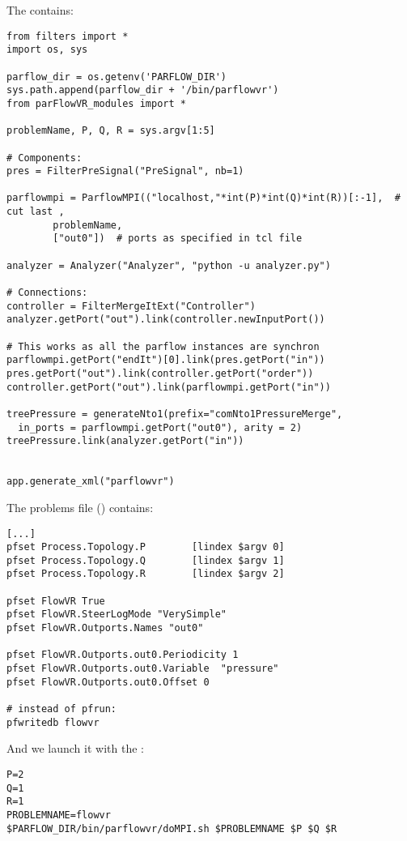 The  contains:
\begin{display}\begin{verbatim}
from filters import *
import os, sys

parflow_dir = os.getenv('PARFLOW_DIR')
sys.path.append(parflow_dir + '/bin/parflowvr')
from parFlowVR_modules import *

problemName, P, Q, R = sys.argv[1:5]

# Components:
pres = FilterPreSignal("PreSignal", nb=1)

parflowmpi = ParflowMPI(("localhost,"*int(P)*int(Q)*int(R))[:-1],  # cut last ,
        problemName,
        ["out0"])  # ports as specified in tcl file

analyzer = Analyzer("Analyzer", "python -u analyzer.py")

# Connections:
controller = FilterMergeItExt("Controller")
analyzer.getPort("out").link(controller.newInputPort())

# This works as all the parflow instances are synchron
parflowmpi.getPort("endIt")[0].link(pres.getPort("in"))
pres.getPort("out").link(controller.getPort("order"))
controller.getPort("out").link(parflowmpi.getPort("in"))

treePressure = generateNto1(prefix="comNto1PressureMerge",
  in_ports = parflowmpi.getPort("out0"), arity = 2)
treePressure.link(analyzer.getPort("in"))


app.generate_xml("parflowvr")
\end{verbatim}\end{display}

The problems  file () contains:
\begin{display}\begin{verbatim}
[...]
pfset Process.Topology.P        [lindex $argv 0]
pfset Process.Topology.Q        [lindex $argv 1]
pfset Process.Topology.R        [lindex $argv 2]

pfset FlowVR True
pfset FlowVR.SteerLogMode "VerySimple"
pfset FlowVR.Outports.Names "out0"

pfset FlowVR.Outports.out0.Periodicity 1
pfset FlowVR.Outports.out0.Variable  "pressure"
pfset FlowVR.Outports.out0.Offset 0

# instead of pfrun:
pfwritedb flowvr
\end{verbatim}\end{display}

And we launch it with the :
\begin{display}\begin{verbatim}
P=2
Q=1
R=1
PROBLEMNAME=flowvr
$PARFLOW_DIR/bin/parflowvr/doMPI.sh $PROBLEMNAME $P $Q $R
\end{verbatim}\end{display}


